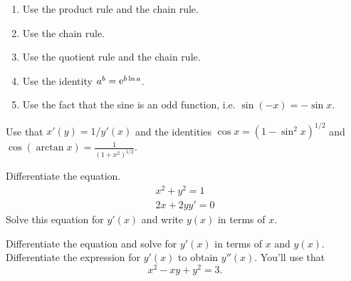 \begin{Hint}
  \label{hint d/dx x sin cos x}
  \renewcommand{\theenumi}{\alph{enumi}}
  \begin{enumerate}
  \item
    Use the product rule and the chain rule.
  \item
    Use the chain rule.
  \item
    Use the quotient rule and the chain rule.
  \item
    Use the identity $a^b = \mathop{\mathrm{e}}\nolimits^{b \ln a}$.
  \item
    Use the fact that the sine is an odd function, i.e. 
    $\sin(-x) = - \sin x$.
  \end{enumerate}
  \renewcommand{\theenumi}{\arabic{enumi}}
\end{Hint}






\begin{Hint}
  \label{hint d/dx arcsin x}
  Use that $x'(y) = 1/y'(x)$ and the identities $\cos x = (1 - \sin^2 x)^{1/2}$
  and $\cos(\arctan x) = \frac{1}{(1+x^2)^{1/2}}$.
\end{Hint}















\begin{Hint}
  \label{hint tangent circle}
  Differentiate the equation.
  \begin{gather*}
    x^2 + y^2 = 1
    \\
    2 x + 2 y y' = 0
  \end{gather*}
  Solve this equation for $y'(x)$ and write $y(x)$ in terms of $x$.
\end{Hint}






\begin{Hint}
  \label{hint y' y'' circle}
  Differentiate the equation and solve for $y'(x)$ in terms of $x$ and $y(x)$.
  Differentiate the expression for $y'(x)$ to obtain $y''(x)$.  You'll use that
  \[
  x^2 - x y + y^2 = 3.
  \]
\end{Hint}



